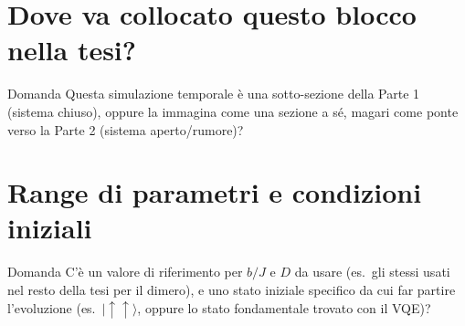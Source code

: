 \documentclass[11pt,a4paper]{article}
\begin{document}
\section{Dove va collocato questo blocco nella tesi?}

\begin{advisorbox}{Domanda}
Questa simulazione temporale è una sotto-sezione della Parte 1
(sistema chiuso), oppure la immagina come una sezione a sé, magari come
ponte verso la Parte 2 (sistema aperto/rumore)?
\end{advisorbox}

\section{Range di parametri e condizioni iniziali}

\begin{advisorbox}{Domanda}
C'è un valore di riferimento per $b/J$ e $D$ da usare (es.\ gli stessi
usati nel resto della tesi per il dimero), e uno stato iniziale
specifico da cui far partire l'evoluzione (es.\
$|\!\uparrow\uparrow\rangle$, oppure lo stato fondamentale trovato con
il VQE)?
\end{advisorbox}
\end{document}
